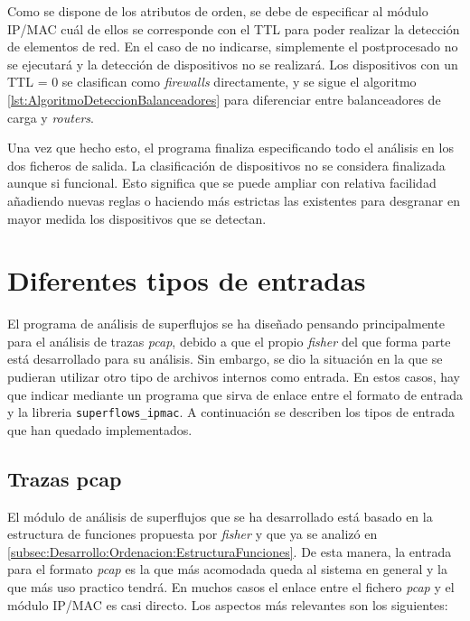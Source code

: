 \documentclass[tfg,epsbased,lof,lot,loa,final,nocopyright,overleaf]{tfgtfmthesisuam}
\begin{document}
Como se dispone de los atributos de orden, se debe de especificar al módulo IP/MAC cuál de ellos se corresponde con el TTL para poder realizar la detección de elementos de red. En el caso de no indicarse, simplemente el postprocesado no se ejecutará y la detección de dispositivos no se realizará. Los dispositivos con un TTL = 0 se clasifican como \textit{firewalls} directamente, y se sigue el algoritmo \ref{lst:AlgoritmoDeteccionBalanceadores} para diferenciar entre balanceadores de carga y \textit{routers}.

Una vez que hecho esto, el programa finaliza especificando todo el análisis en los dos ficheros de salida. La clasificación de dispositivos no se considera finalizada aunque si funcional. Esto significa que se puede ampliar con relativa facilidad añadiendo nuevas reglas o haciendo más estrictas las existentes para desgranar en mayor medida los dispositivos que se detectan.


\section{Diferentes tipos de entradas}
El programa de análisis de superflujos se ha diseñado pensando principalmente para el análisis de trazas \textit{pcap}, debido a que el propio \textit{fisher} del que forma parte está desarrollado para su análisis. Sin embargo, se dio la situación en la que se pudieran utilizar otro tipo de archivos internos como entrada. En estos casos, hay que indicar mediante un programa que sirva de enlace entre el formato de entrada y la libreria \texttt{superflows\_ipmac}. A continuación se describen los tipos de entrada que han quedado implementados.

\subsection{Trazas pcap}
El módulo de análisis de superflujos que se ha desarrollado está basado en la estructura de funciones propuesta por \textit{fisher} y que ya se analizó en \ref{subsec:Desarrollo:Ordenacion:EstructuraFunciones}. De esta manera, la entrada para el formato \textit{pcap} es la que más acomodada queda al sistema en general y la que más uso practico tendrá. En muchos casos el enlace entre el fichero \textit{pcap} y el módulo IP/MAC es casi directo. Los aspectos más relevantes son los siguientes:
\end{document}
